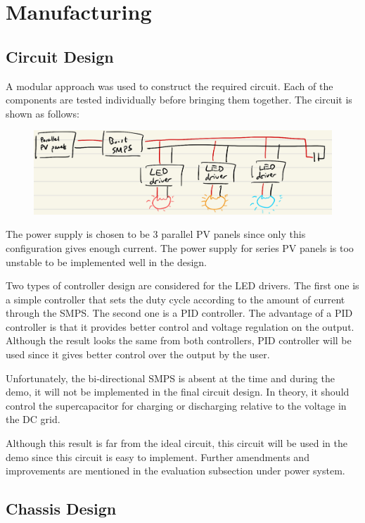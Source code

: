 \section{Manufacturing}
\subsection{Circuit Design}
A modular approach was used to construct the required circuit. Each of the components are tested individually before bringing them together. The circuit is shown as follows:

\begin{figure}
    \centering
    \includegraphics[width=0.8\linewidth]{images/circuit-design.png}
    \caption{}
\end{figure}

The power supply is chosen to be 3 parallel PV panels since only this configuration gives enough current. The power supply for series PV panels is too unstable to be implemented well in the design.

Two types of controller design are considered for the LED drivers. The first one is a simple controller that sets the duty cycle according to the amount of current through the SMPS. The second one is a PID controller. The advantage of a PID controller is that it provides better control and voltage regulation on the output. Although the result looks the same from both controllers, PID controller will be used since it gives better control over the output by the user.

Unfortunately, the bi-directional SMPS is absent at the time and during the demo, it will not be implemented in the final circuit design. In theory, it should control the supercapacitor for charging or discharging relative to the voltage in the DC grid.

Although this result is far from the ideal circuit, this circuit will be used in the demo since this circuit is easy to implement. Further amendments and improvements are mentioned in the evaluation subsection under power system.

\subsection{Chassis Design}

